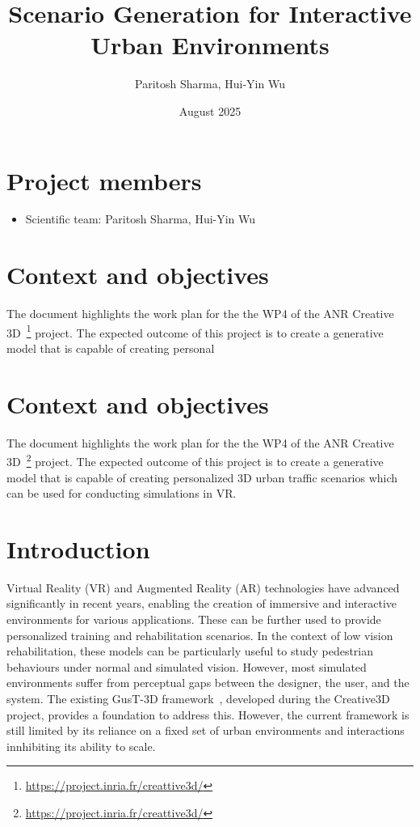 \documentclass{article}
\title{Scenario Generation for Interactive Urban Environments}
\author{Paritosh Sharma, Hui-Yin Wu}
\date{August 2025}
\begin{document}
\maketitle

\section*{Project members}

\begin{itemize}
    \item Scientific team: Paritosh Sharma, Hui-Yin Wu
\end{itemize}

\section{Context and objectives}

The document highlights the work plan for the the WP4 of the ANR Creative 3D~\footnote{\url{https://project.inria.fr/creattive3d/}} project. The expected outcome of this project is to create a generative model that is capable of creating personal
\section{Context and objectives}

The document highlights the work plan for the the WP4 of the ANR Creative 3D~\footnote{\url{https://project.inria.fr/creattive3d/}} project. The expected outcome of this project is to create a generative model that is capable of creating personalized 3D urban traffic scenarios which can be used for conducting simulations in VR.

\section{Introduction}

Virtual Reality (VR) and Augmented Reality (AR) technologies have advanced significantly in recent years, enabling the creation of immersive and interactive environments for various applications. These can be further used to provide personalized training and rehabilitation scenarios. In the context of low vision rehabilitation, these models can be particularly useful to study pedestrian behaviours under normal and simulated vision. However, most simulated environments suffer from perceptual gaps between the designer, the user, and the system. The existing GusT-3D framework~\cite{wu2022designing}, developed during the Creative3D project, provides a foundation to address this. However, the current framework is still limited by its reliance on a fixed set of urban environments and interactions innhibiting its ability to scale.
\end{document}
